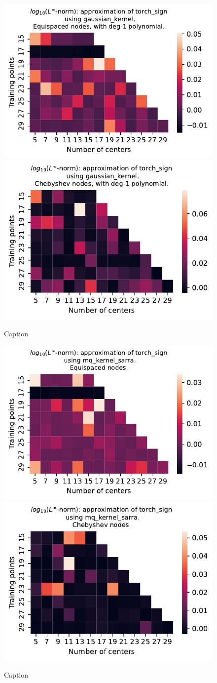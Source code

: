 \documentclass[12pt]{report} %
\begin{document}
\begin{figure}[ht]
  \centering

  \includegraphics[width=.49\textwidth]{imagenes/experiments/1d/variational/torch_sign-Kgaussian_kernel-Poly-Equi.pdf}
  \includegraphics[width=.49\textwidth]{imagenes/experiments/1d/variational/torch_sign-Kgaussian_kernel-Poly-Cheb.pdf}
  \caption{Caption}
  \label{fig:torch-sign-gaussian-poly}
\end{figure}


\begin{figure}[ht]
  \centering

  \includegraphics[width=.49\textwidth]{imagenes/experiments/1d/variational/torch_sign-Kmq_kernel_sarra-Equi.pdf}
  \includegraphics[width=.49\textwidth]{imagenes/experiments/1d/variational/torch_sign-Kmq_kernel_sarra-Cheb.pdf}
  \caption{Caption}
  \label{fig:torch-sign-sarra}
\end{figure}
\end{document}
